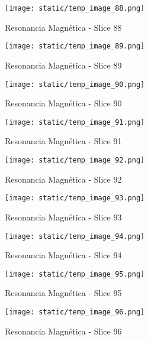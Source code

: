 \documentclass[12pt,a4paper]{article}%
\begin{document}
%


\begin{figure}[H]%
\centering%
\texttt{[image: static/temp\_image\_88.png]}%
\caption{Resonancia Magnética {-} Slice 88}%
\end{figure}

%


\begin{figure}[H]%
\centering%
\texttt{[image: static/temp\_image\_89.png]}%
\caption{Resonancia Magnética {-} Slice 89}%
\end{figure}

%


\begin{figure}[H]%
\centering%
\texttt{[image: static/temp\_image\_90.png]}%
\caption{Resonancia Magnética {-} Slice 90}%
\end{figure}

%


\begin{figure}[H]%
\centering%
\texttt{[image: static/temp\_image\_91.png]}%
\caption{Resonancia Magnética {-} Slice 91}%
\end{figure}

%


\begin{figure}[H]%
\centering%
\texttt{[image: static/temp\_image\_92.png]}%
\caption{Resonancia Magnética {-} Slice 92}%
\end{figure}

%


\begin{figure}[H]%
\centering%
\texttt{[image: static/temp\_image\_93.png]}%
\caption{Resonancia Magnética {-} Slice 93}%
\end{figure}

%


\begin{figure}[H]%
\centering%
\texttt{[image: static/temp\_image\_94.png]}%
\caption{Resonancia Magnética {-} Slice 94}%
\end{figure}

%


\begin{figure}[H]%
\centering%
\texttt{[image: static/temp\_image\_95.png]}%
\caption{Resonancia Magnética {-} Slice 95}%
\end{figure}

%


\begin{figure}[H]%
\centering%
\texttt{[image: static/temp\_image\_96.png]}%
\caption{Resonancia Magnética {-} Slice 96}%
\end{figure}
\end{document}
